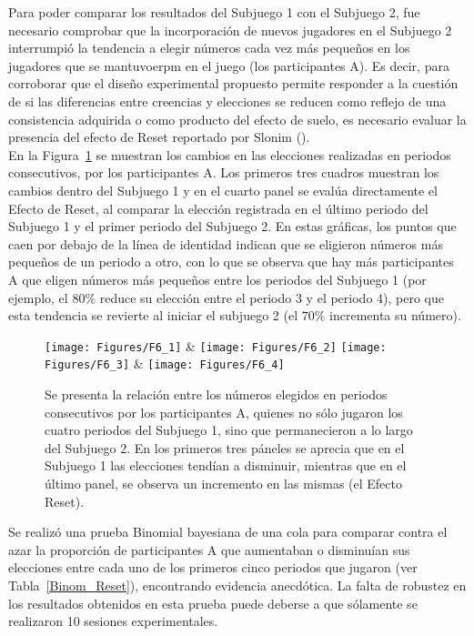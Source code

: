 Para poder comparar los resultados del Subjuego 1 con el Subjuego 2, fue necesario comprobar que la incorporación de nuevos jugadores en el Subjuego 2 interrumpió la tendencia a elegir números cada vez más pequeños en los jugadores que se mantuvoerpm en el juego (los participantes A). Es decir, para corroborar que el diseño experimental propuesto permite responder a la cuestión de si las diferencias entre creencias y elecciones se reducen como reflejo de una consistencia adquirida o como producto del efecto de suelo, es necesario evaluar la presencia del efecto de Reset reportado por Slonim (\citeyear{Slonim}).\\

En la Figura~\ref{fig:Reset_cambios} se muestran los cambios en las elecciones realizadas en periodos consecutivos, por los participantes A. Los primeros tres cuadros muestran los cambios dentro del Subjuego 1 y en el cuarto panel se evalúa directamente el Efecto de Reset, al comparar la elección registrada en el último periodo del Subjuego 1 y el primer periodo del Subjuego 2. En estas gráficas, los puntos que caen por debajo de la línea de identidad indican que se eligieron números más pequeños de un periodo a otro, con lo que se observa que hay más participantes A que eligen números más pequeños entre los periodos del Subjuego 1 (por ejemplo, el $80\%$ reduce su elección entre el periodo 3 y el periodo 4), pero que esta tendencia se revierte al iniciar el subjuego 2 (el $70\%$ incrementa su número).\\

\begin{figure}[hp]
\centering
\texttt{[image: Figures/F6\_1]} & \texttt{[image: Figures/F6\_2]} 
\texttt{[image: Figures/F6\_3]} & \texttt{[image: Figures/F6\_4]} 
\decoRule
\caption[Elecciones registradas en ensayos consecutivos]{Se presenta la relación entre los números elegidos en periodos consecutivos por los participantes A, quienes no sólo jugaron los cuatro periodos del Subjuego 1, sino que permanecieron a lo largo del Subjuego 2. En los primeros tres páneles se aprecia que en el Subjuego 1 las elecciones tendían a disminuir, mientras que en el último panel, se observa un incremento en las mismas (el Efecto Reset).}
\label{fig:Reset_cambios}
\end{figure}

Se realizó una prueba Binomial bayesiana de una cola para comparar contra el azar la proporción de participantes A que aumentaban o disminuían sus elecciones entre cada uno de los primeros cinco periodos que jugaron (ver Tabla~\ref{Binom_Reset}), encontrando evidencia anecdótica. La falta de robustez en los resultados obtenidos en esta prueba puede deberse a que sólamente se realizaron 10 sesiones experimentales.\\

